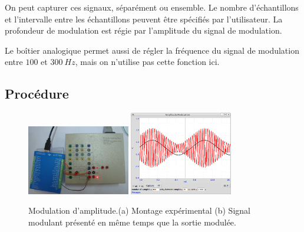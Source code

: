 \documentclass{book}
\begin{document}
On peut capturer ces signaux, séparément ou ensemble. Le nombre d'échantillons et l'intervalle entre les échantillons peuvent être spécifiés par l'utilisateur. La profondeur de modulation est régie par l'amplitude du signal de modulation.



Le boîtier analogique permet aussi de régler la fréquence du signal de modulation entre $100$ et $300\ Hz$, mais on n'utilise pas cette fonction ici.

\subsection{Procédure}


\begin{figure}[h!]
\begin{center}
\caption{\label{fig:Amplitude-modulation}Modulation d'amplitude.(a) Montage expérimental (b) Signal modulant présenté en même temps que la sortie modulée. }\vspace{0.5em}
\includegraphics[width=0.4\textwidth, height=0.3\textwidth, keepaspectratio]{Schematic-AM-photo.png}
\includegraphics[width=0.4\textwidth, height=0.3\textwidth, keepaspectratio]{Pic-AMcarr-and-sig400x20.png}
\end{center}
\end{figure}
\end{document}
